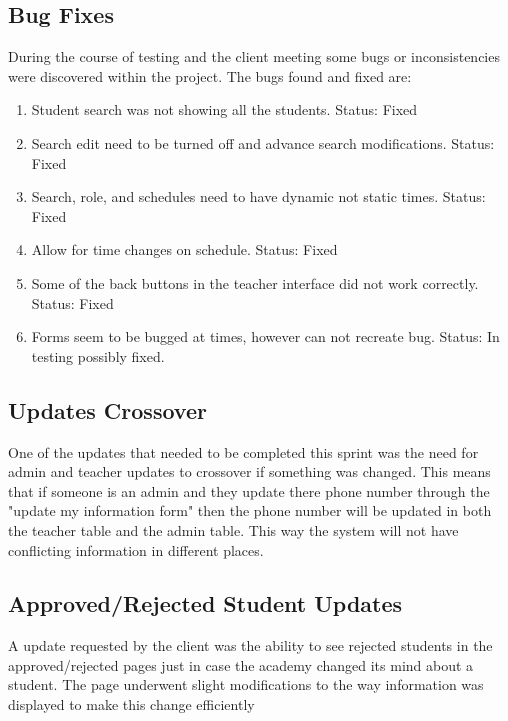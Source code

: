 \subsection{Bug Fixes}
During the course of testing and the client meeting some bugs or inconsistencies were discovered within the project. The bugs found and fixed are:

\begin{enumerate}
\item Student search was not showing all the students. Status: Fixed
\item Search edit need to be turned off and advance search modifications. Status: Fixed
\item Search, role, and schedules need to have dynamic not static times. Status: Fixed
\item Allow for time changes on schedule. Status: Fixed
\item Some of the back buttons in the teacher interface did not work correctly. Status: Fixed
\item Forms seem to be bugged at times, however can not recreate bug. Status: In testing possibly fixed.  
\end{enumerate}

\subsection{Updates Crossover}
One of the updates that needed to be completed this sprint was the need for admin and teacher updates to crossover if something was changed. This means that if someone is an admin and they update there phone number through the "update my information form" then the phone number will be updated in both the teacher table and the admin table. This way the system will not have conflicting information in different places. 

\subsection{Approved/Rejected Student Updates}
A update requested by the client was the ability to see rejected students in the approved/rejected pages just in case the academy changed its mind about a student. The page underwent slight modifications to the way information was displayed to make this change efficiently\\

